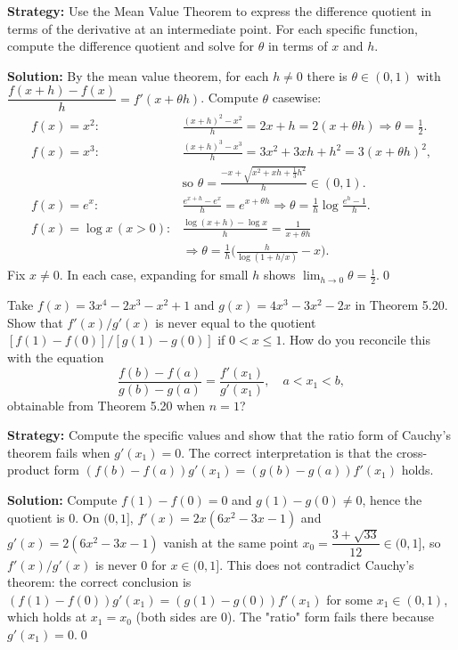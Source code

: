 \noindent\textbf{Strategy:} Use the Mean Value Theorem to express the difference quotient in terms of the derivative at an intermediate point. For each specific function, compute the difference quotient and solve for \( \theta \) in terms of \( x \) and \( h \).

\bigskip\noindent\textbf{Solution:}
By the mean value theorem, for each $h\ne 0$ there is $\theta\in(0,1)$ with $\dfrac{f(x+h)-f(x)}{h}=f'(x+\theta h)$. Compute $\theta$ casewise:
\[\begin{aligned}
f(x)=x^2:&\frac{(x+h)^2-x^2}{h}=2x+h=2(x+\theta h)\Rightarrow\theta=\tfrac12.\\
f(x)=x^3:&\frac{(x+h)^3-x^3}{h}=3x^2+3xh+h^2=3(x+\theta h)^2,\\
& \text{so }\theta=\frac{-x+\sqrt{x^2+xh+\tfrac13 h^2}}{h}\in(0,1).\\
f(x)=e^x:&\frac{e^{x+h}-e^x}{h}=e^{x+\theta h}\Rightarrow \theta=\frac1h\log\frac{e^h-1}{h}.\\
f(x)=\log x\,(x>0):&\frac{\log(x+h)-\log x}{h}=\frac{1}{x+\theta h} \\
& \Rightarrow \theta=\frac{1}{h}\Big(\frac{h}{\log(1+h/x)}-x\Big).
\end{aligned}\]
Fix $x\ne 0$. In each case, expanding for small $h$ shows $\lim_{h\to 0}\theta=\tfrac12$.\qed


\begin{problembox}
Take \( f(x) = 3x^4 - 2x^3 - x^2 + 1 \) and \( g(x) = 4x^3 - 3x^2 - 2x \) in Theorem 5.20. Show that \( f'(x)/g'(x) \) is never equal to the quotient \( [f(1) - f(0)]/[g(1) - g(0)] \) if \( 0 < x \leq 1 \). How do you reconcile this with the equation
\[ \frac{f(b) - f(a)}{g(b) - g(a)} = \frac{f'(x_1)}{g'(x_1)}, \quad a < x_1 < b, \]
obtainable from Theorem 5.20 when \( n = 1 \)?
\end{problembox}

\noindent\textbf{Strategy:} Compute the specific values and show that the ratio form of Cauchy's theorem fails when \( g'(x_1) = 0 \). The correct interpretation is that the cross-product form \( (f(b) - f(a))g'(x_1) = (g(b) - g(a))f'(x_1) \) holds.

\bigskip\noindent\textbf{Solution:}
Compute $f(1)-f(0)=0$ and $g(1)-g(0)\ne 0$, hence the quotient is $0$. On $(0,1]$, $f'(x)=2x(6x^2-3x-1)$ and $g'(x)=2(6x^2-3x-1)$ vanish at the same point $x_0=\dfrac{3+\sqrt{33}}{12}\in(0,1]$, so $f'(x)/g'(x)$ is never $0$ for $x\in(0,1]$. This does not contradict Cauchy's theorem: the correct conclusion is $(f(1)-f(0))g'(x_1)=(g(1)-g(0))f'(x_1)$ for some $x_1\in(0,1)$, which holds at $x_1=x_0$ (both sides are $0$). The "ratio" form fails there because $g'(x_1)=0$.\qed



